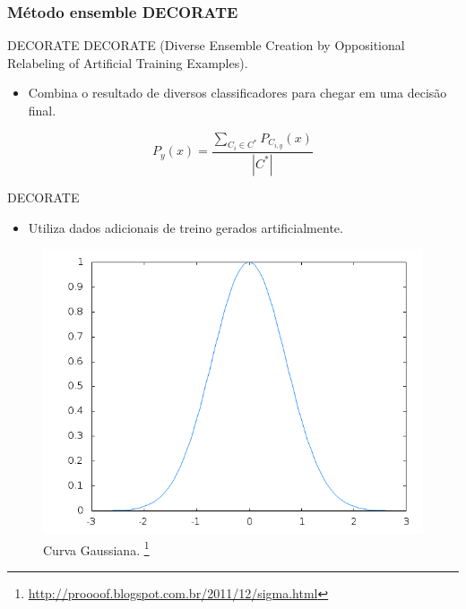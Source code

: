 \documentclass[brazil]{beamer}
\DeclareMathOperator*{\argmax}{arg\,max}
\begin{document}
\subsubsection{Método ensemble DECORATE }

\begin{frame}{DECORATE \cite{Melville:2003, Melville:2004, *}}
\justifying DECORATE (Diverse Ensemble Creation by Oppositional Relabeling of Artificial Training Examples).
   \begin{itemize}
\justifying
      \item Combina o resultado de diversos classificadores para chegar em uma decisão final.
   \end{itemize}

\begin{equation}
  P_{y}(x) = \frac{\sum\limits_{C_{i}\in C^*} P_{C_{i,y}}(x)}{|C^*|}
  \label{eq:decorate}
\end{equation}


\end{frame}

\begin{frame}{DECORATE}
   \begin{itemize}
\justifying
      \item Utiliza dados adicionais de treino gerados artificialmente.
   \end{itemize}
   \begin{figure}[!htb] \centering 
     \centering
     \includegraphics[width=.65\columnwidth]{slide/gaussiana1} 
     \caption{Curva Gaussiana. \footnote[frame]{\url{http://proooof.blogspot.com.br/2011/12/sigma.html}}} 
     \label{fig:gaussiana1}
   \end{figure}
\end{frame}
\end{document}
